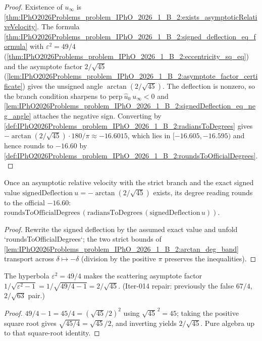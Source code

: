 \begin{proof}
Existence of $u_\infty$ is
\cref{thm:IPhO2026Problems_problem_IPhO_2026_1_B_2:exists_asymptoticRelativeVelocity}.
The formula
\cref{thm:IPhO2026Problems_problem_IPhO_2026_1_B_2:signed_deflection_eq_formula}
with $\varepsilon^2 = 49/4$
(\cref{thm:IPhO2026Problems_problem_IPhO_2026_1_B_2:eccentricity_sq_eq})
and the asymptote factor $2/\sqrt{45}$
(\cref{lem:IPhO2026Problems_problem_IPhO_2026_1_B_2:asymptote_factor_certificate})
gives the unsigned angle $\arctan(2/\sqrt{45})$.  The deflection is
nonzero, so the branch condition sharpens to
$\mathrm{perp}\ \hat u_0\ u_\infty < 0$ and
\cref{lem:IPhO2026Problems_problem_IPhO_2026_1_B_2:signedDeflection_eq_neg_angle}
attaches the negative sign.  Converting by
\cref{def:IPhO2026Problems_problem_IPhO_2026_1_B_2:radiansToDegrees} gives
$-\arctan(2/\sqrt{45}) \cdot 180/\pi \approx -16.6015$, which lies
in $[-16.605, -16.595)$ and hence rounds to $-16.60$ by
\cref{def:IPhO2026Problems_problem_IPhO_2026_1_B_2:roundsToOfficialDegrees}.
\end{proof}

\begin{lemma}
\label{lem:IPhO2026Problems_problem_IPhO_2026_1_B_2:signed_deflection_certificate}
Once an asymptotic relative velocity with the strict branch and the exact
signed value $\mathrm{signedDeflection}\ u = -\arctan(2/\sqrt{45})$ exists,
its degree reading rounds to the official $-16.60$:
$\mathrm{roundsToOfficialDegrees}\,(\mathrm{radiansToDegrees}\,
(\mathrm{signedDeflection}\,u))$.
\end{lemma}
\begin{proof}
Rewrite the signed deflection by the assumed exact value and unfold
`roundsToOfficialDegrees`; the two strict bounds of
\cref{lem:IPhO2026Problems_problem_IPhO_2026_1_B_2:arctan_deg_band}
transport across $\delta \mapsto -\delta$ (division by the positive $\pi$
preserves the inequalities).
\end{proof}

\begin{lemma}
\label{lem:IPhO2026Problems_problem_IPhO_2026_1_B_2:asymptote_factor_certificate}
The hyperbola $\varepsilon^2 = 49/4$ makes the scattering asymptote factor
$1/\sqrt{\varepsilon^2 - 1} = 1/\sqrt{49/4 - 1} = 2/\sqrt{45}$.
(Iter-014 repair: previously the false $67/4$, $2/\sqrt{63}$ pair.)
\end{lemma}
\begin{proof}
$49/4 - 1 = 45/4 = (\sqrt{45}/2)^2$ using $\sqrt{45}^{\,2} = 45$; taking
the positive square root gives $\sqrt{45/4} = \sqrt{45}/2$, and inverting
yields $2/\sqrt{45}$.  Pure algebra up to that square-root identity.
\end{proof}

